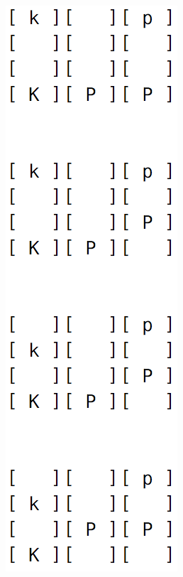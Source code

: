 \documentclass{article}
\begin{document}
		\begin{figure}[h!]
		\centering
        \begin{subfigure}{0.23\textwidth}
                \includegraphics[width=\linewidth]{visual_game_1}

\end{subfigure}
\end{figure}
\end{document}
